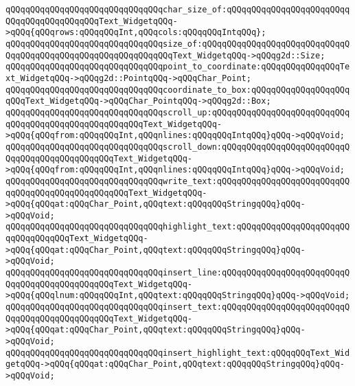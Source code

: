 \verb|qQQqqQQqqQQqqQQqqQQqqQQqqQQqqQQqchar_size_of:qQQqqQQqqQQqqQQqqQQqqQQqqQQqqQQqqQQqqQQqqQQqText_WidgetqQQq->qQQq{qQQqrows:qQQqqQQqInt,qQQqcols:qQQqqQQqIntqQQq};|\newline
\verb|qQQqqQQqqQQqqQQqqQQqqQQqqQQqqQQqsize_of:qQQqqQQqqQQqqQQqqQQqqQQqqQQqqQQqqQQqqQQqqQQqqQQqqQQqqQQqqQQqqQQqText_WidgetqQQq->qQQqg2d::Size;|\newline
\newline
\verb|qQQqqQQqqQQqqQQqqQQqqQQqqQQqqQQqpoint_to_coordinate:qQQqqQQqqQQqqQQqText_WidgetqQQq->qQQqg2d::PointqQQq->qQQqChar_Point;|\newline
\verb|qQQqqQQqqQQqqQQqqQQqqQQqqQQqqQQqcoordinate_to_box:qQQqqQQqqQQqqQQqqQQqqQQqText_WidgetqQQq->qQQqChar_PointqQQq->qQQqg2d::Box;|\newline
\newline
\verb|qQQqqQQqqQQqqQQqqQQqqQQqqQQqqQQqscroll_up:qQQqqQQqqQQqqQQqqQQqqQQqqQQqqQQqqQQqqQQqqQQqqQQqqQQqqQQqText_WidgetqQQq->qQQq{qQQqfrom:qQQqqQQqInt,qQQqnlines:qQQqqQQqIntqQQq}qQQq->qQQqVoid;|\newline
\verb|qQQqqQQqqQQqqQQqqQQqqQQqqQQqqQQqscroll_down:qQQqqQQqqQQqqQQqqQQqqQQqqQQqqQQqqQQqqQQqqQQqqQQqText_WidgetqQQq->qQQq{qQQqfrom:qQQqqQQqInt,qQQqnlines:qQQqqQQqIntqQQq}qQQq->qQQqVoid;|\newline
\newline
\verb|qQQqqQQqqQQqqQQqqQQqqQQqqQQqqQQqwrite_text:qQQqqQQqqQQqqQQqqQQqqQQqqQQqqQQqqQQqqQQqqQQqqQQqqQQqText_WidgetqQQq->qQQq{qQQqat:qQQqChar_Point,qQQqtext:qQQqqQQqStringqQQq}qQQq->qQQqVoid;|\newline
\verb|qQQqqQQqqQQqqQQqqQQqqQQqqQQqqQQqhighlight_text:qQQqqQQqqQQqqQQqqQQqqQQqqQQqqQQqqQQqText_WidgetqQQq->qQQq{qQQqat:qQQqChar_Point,qQQqtext:qQQqqQQqStringqQQq}qQQq->qQQqVoid;|\newline
\newline
\verb|qQQqqQQqqQQqqQQqqQQqqQQqqQQqqQQqinsert_line:qQQqqQQqqQQqqQQqqQQqqQQqqQQqqQQqqQQqqQQqqQQqqQQqText_WidgetqQQq->qQQq{qQQqlnum:qQQqqQQqInt,qQQqtext:qQQqqQQqStringqQQq}qQQq->qQQqVoid;|\newline
\verb|qQQqqQQqqQQqqQQqqQQqqQQqqQQqqQQqinsert_text:qQQqqQQqqQQqqQQqqQQqqQQqqQQqqQQqqQQqqQQqqQQqqQQqText_WidgetqQQq->qQQq{qQQqat:qQQqChar_Point,qQQqtext:qQQqqQQqStringqQQq}qQQq->qQQqVoid;|\newline
\verb|qQQqqQQqqQQqqQQqqQQqqQQqqQQqqQQqinsert_highlight_text:qQQqqQQqText_WidgetqQQq->qQQq{qQQqat:qQQqChar_Point,qQQqtext:qQQqqQQqStringqQQq}qQQq->qQQqVoid;|\newline
\newline
